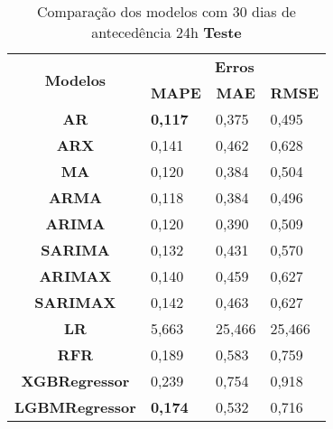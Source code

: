 \begin{table}[H]
	\centering
	\caption{Comparação dos modelos com 30 dias de antecedência 24h \textbf{Teste} }\label{tb:60-24tst}
	\begin{tabular}{@{}clll@{}}
		\toprule
		\multirow{2}{*}{\textbf{Modelos}} & \multicolumn{3}{c}{\textbf{Erros}}                                                                       \\ \cmidrule(l){2-4} 
		& \multicolumn{1}{c}{\textbf{MAPE}} & \multicolumn{1}{c}{\textbf{MAE}} & \multicolumn{1}{c}{\textbf{RMSE}} \\ \hline
\textbf{AR}                       & \textbf{0,117}                             & 0,375                            & 0,495                             \\
\textbf{ARX}                      & 0,141                             & 0,462                            & 0,628                             \\
\textbf{MA}                       & 0,120                             & 0,384                            & 0,504                             \\
\textbf{ARMA}                     & 0,118                             & 0,384                            & 0,496                             \\
\textbf{ARIMA}                    & 0,120                             & 0,390                            & 0,509                             \\
\textbf{SARIMA}                   & 0,132                             & 0,431                            & 0,570                             \\
\textbf{ARIMAX}                   & 0,140                             & 0,459                            & 0,627                             \\
\textbf{SARIMAX}                  & 0,142                             & 0,463                            & 0,627                             \\
\textbf{LR}                       & 5,663                             & 25,466                           & 25,466                            \\
\textbf{RFR}                      & 0,189                             & 0,583                            & 0,759                             \\
\textbf{XGBRegressor}             & 0,239                             & 0,754                            & 0,918                             \\
\textbf{LGBMRegressor}            & \textbf{0,174}                             & 0,532                            & 0,716                             \\ \bottomrule
	\end{tabular}

\end{table}

